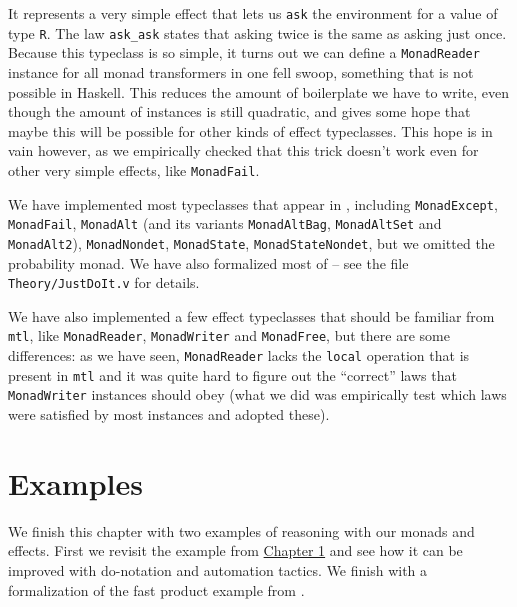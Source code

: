 \documentclass[declaration,inz,english,shortabstract]{iithesis}
\newcommand{\m}[1]{\texttt{#1}}
\begin{document}
It represents a very simple effect that lets us \m{ask} the environment for a value of type \m{R}. The law \m{ask\_ask} states that asking twice is the same as asking just once. Because this typeclass is so simple, it turns out we can define a \m{MonadReader} instance for all monad transformers in one fell swoop, something that is not possible in Haskell. This reduces the amount of boilerplate we have to write, even though the amount of instances is still quadratic, and gives some hope that maybe this will be possible for other kinds of effect typeclasses. This hope is in vain however, as we empirically checked that this trick doesn't work even for other very simple effects, like \m{MonadFail}.

We have implemented most typeclasses that appear in \cite{JustDoIt}, including \m{MonadExcept}, \m{MonadFail}, \m{MonadAlt} (and its variants \m{MonadAltBag}, \m{MonadAltSet} and \m{MonadAlt2}), \m{MonadNondet}, \m{MonadState}, \m{MonadStateNondet}, but we omitted the probability monad. We have also formalized most of \cite{JustDoIt} -- see the file \m{Theory/JustDoIt.v} for details.

We have also implemented a few effect typeclasses that should be familiar from \m{mtl}, like \m{MonadReader}, \m{MonadWriter} and \m{MonadFree}, but there are some differences: as we have seen, \m{MonadReader} lacks the \m{local} operation that is present in \m{mtl} and it was quite hard to figure out the ``correct'' laws that \m{MonadWriter} instances should obey (what we did was empirically test which laws were satisfied by most instances and adopted these).


\section{Examples}

We finish this chapter with two examples of reasoning with our monads and effects. First we revisit the example from \hyperref[ch1]{Chapter 1} and see how it can be improved with do-notation and automation tactics. We finish with a formalization of the fast product example from \cite{JustDoIt}.
\end{document}
